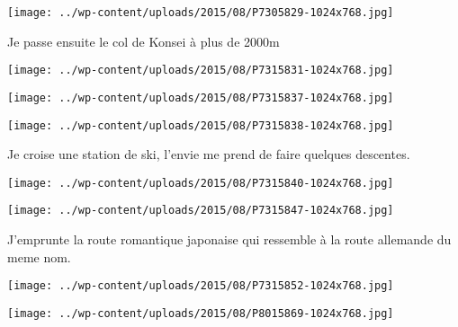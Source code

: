 \begin{center} \texttt{[image: ../wp-content/uploads/2015/08/P7305829-1024x768.jpg]} \end{center}

 

 Je passe ensuite le col de Konsei à plus de 2000m 

 

\begin{center} \texttt{[image: ../wp-content/uploads/2015/08/P7315831-1024x768.jpg]} \end{center}

 

 

\begin{center} \texttt{[image: ../wp-content/uploads/2015/08/P7315837-1024x768.jpg]} \end{center}

 

 

\begin{center} \texttt{[image: ../wp-content/uploads/2015/08/P7315838-1024x768.jpg]} \end{center}

 

 Je croise une station de ski, l'envie me prend de faire quelques descentes. 

 

\begin{center} \texttt{[image: ../wp-content/uploads/2015/08/P7315840-1024x768.jpg]} \end{center}

 

 

\begin{center} \texttt{[image: ../wp-content/uploads/2015/08/P7315847-1024x768.jpg]} \end{center}

 

 J'emprunte la route romantique japonaise qui ressemble à la route allemande du meme nom. 

 

\begin{center} \texttt{[image: ../wp-content/uploads/2015/08/P7315852-1024x768.jpg]} \end{center}

 

 

\begin{center} \texttt{[image: ../wp-content/uploads/2015/08/P8015869-1024x768.jpg]} \end{center}

